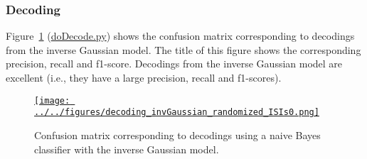 \documentclass[10pt]{article}
\begin{document}
\subsubsection{Decoding}

Figure~\ref{fig:invGaussianModelConusionMatrix} (\href{https://github.com/joacorapela/singleNeuronSpikesAnalysisTutorial/blob/master/code/scripts/doDecode.py}{doDecode.py}) shows the confusion matrix corresponding to decodings from the inverse Gaussian model. The title of this figure shows the corresponding precision, recall and f1-score. Decodings from the inverse Gaussian model are excellent (i.e., they have a large precision, recall and f1-scores).

\begin{figure}
    \href{http://www.gatsby.ucl.ac.uk/~rapela/singleNeuronSpikesAnalysisTutorial/figures/decoding_exponential_randomized_ISIs0.html}{\texttt{[image: ../../figures/decoding\_invGaussian\_randomized\_ISIs0.png]}}
    \caption{Confusion matrix corresponding to decodings using a naive Bayes classifier with the inverse Gaussian model.}
    \label{fig:invGaussianModelConusionMatrix}
\end{figure}
\end{document}
